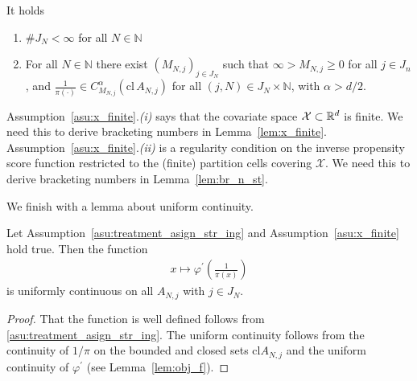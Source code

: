 \begin{assumption}
   \label{asu:x_finite}
   It holds
   \begin{enumerate}[label=(\roman*)]
     \item 
       $\# J_N<\infty$ for all $N\in\mathbb{N}$
\item
  For all $N\in\mathbb{N}$ there exist $(M_{N,j})_{j\in J_N}$ such that $\infty>M_{N,j}\ge 0$ for all $j\in J_n$, and 
  $\frac{1}{\pi(\cdot)}\in C^\alpha_{M_{N,j}}(\mathrm{cl}\,A_{N,j})$ for all $(j,N)\in J_N\times \mathbb{N}$, with $\alpha>d/2$.
   \end{enumerate}
 \end{assumption}
 \begin{remark}
   Assumption~\ref{asu:x_finite}.\textit{(i)} says that the covariate space $\mathcal{X}\subset \mathbb{R}^d$ is finite.
   We need this to derive bracketing numbers in Lemma~\ref{lem:x_finite}.
   Assumption~\ref{asu:x_finite}.\textit{(ii)} is a regularity condition on the inverse propensity score function restricted to the (finite) partition cells covering $\mathcal{X}$.
   We need this to derive bracketing numbers in Lemma~\ref{lem:br_n_st}.
 \end{remark}
 We finish with a lemma about uniform continuity.
 \begin{lemma}
   \label{lem:ips_unif_cont}
   Let Assumption~\eqref{asu:treatment_asign_str_ing} and Assumption~\ref{asu:x_finite} hold true.
   Then the function 
   \begin{align*}
     x\mapsto 
     \varphi^{'}
     \left( \frac{1}{\pi(x)} \right)
   \end{align*}
   is uniformly continuous on all $A_{N,j}$ with $j\in J_N$.
 \end{lemma}
 \begin{proof}
   That the function is well defined follows from \eqref{asu:treatment_asign_str_ing}.
   The uniform continuity follows from the continuity of $1/\pi$ on the bounded 
   and closed sets $\mathrm{cl} A_{N,j}$ and the uniform continuity of 
   $
   \varphi^{'}
   $ (see Lemma~\ref{lem:obj_f}).
 \end{proof}
